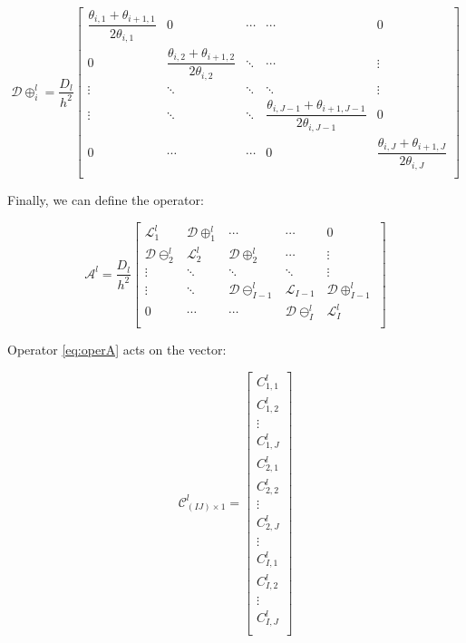 \documentclass[11pt,a4paper]{article}
\begin{document}
\begin{flushleft}
\begin{equation}
\label{eq:diag_i+1}
\mathcal{D}\oplus^l_{i}=\dfrac{D_l}{h^2}
\begin{bmatrix}
\dfrac{\theta_{i,1}+\theta_{i+1,1}}{2\theta_{i,1}} & 0 & \cdots & \cdots & 0 \\
0 & \dfrac{\theta_{i,2}+\theta_{i+1,2}}{2\theta_{i,2}} & \ddots & \cdots & \vdots \\
\vdots & \ddots & \ddots & \ddots &  \vdots   \\
\vdots & \ddots & \ddots & \dfrac{\theta_{i,J-1}+\theta_{i+1,J-1}}{2\theta_{i,J-1}} &  0   \\
0& \cdots & \cdots & 0 &    \dfrac{\theta_{i,J}+\theta_{i+1,J}}{2\theta_{i,J}}\\
\end{bmatrix}
\end{equation}

\bigskip Finally, we can define the operator:

\begin{equation}
\label{eq:operA}
\mathcal{A}^l=\dfrac{D_l}{h^2}
\begin{bmatrix}
\mathcal{L}^l_1 & \mathcal{D}\oplus^l_1 & \cdots & \cdots & 0 \\
\mathcal{D}\ominus^l_2 & \mathcal{L}^l_2 & \mathcal{D}\oplus^l_{2} & \cdots & \vdots \\
\vdots & \ddots & \ddots & \ddots &  \vdots   \\
\vdots & \ddots & \mathcal{D}\ominus^l_{I-1} & \mathcal{L}_{I-1}    &  \mathcal{D}\oplus^l_{I-1}    \\
0& \cdots & \cdots & \mathcal{D}\ominus^l_I &    \mathcal{L}^l_I \\
\end{bmatrix}
\end{equation}

\bigskip Operator \ref{eq:operA} acts on the vector:

$$\mathbf{\mathcal{C}}^l_{(IJ) \times 1} = \begin{bmatrix}
 C^l_{1,1} \\ C^l_{1,2} \\ \vdots \\ C^l_{1,J} \\ C^l_{2,1} \\ C^l_{2,2} \\ \vdots \\ C^l_{2,J} \\ \vdots \\ C^l_{I,1} \\ C^l_{I,2} \\ \vdots \\ C^l_{I,J}\\
\end{bmatrix}$$


\end{flushleft}
\end{document}
